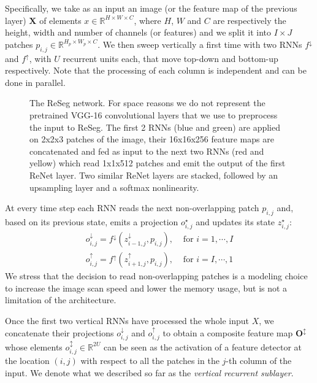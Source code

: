 \documentclass[times,art10,twocolumn,latex8]{article}
\newcommand{\RR}[0]{\mathbb{R}}
\begin{document}
Specifically, we take as an input an image (or the feature map of the previous
layer) $\mathbf{X}$ of elements $x \in \RR^{H \times W \times C}$, where $H$,
$W$ and $C$ are respectively the height, width and number of channels (or
features) and we split it into $I \times J$ patches $p_{i,j} \in \RR^{H_p
\times W_p \times C}$. We then sweep vertically a first time with two RNNs $f^{\downarrow}$ and $f^{\uparrow}$,
with $U$ recurrent units each, that move top-down and bottom-up respectively.
Note that the processing of each column is independent and can be done in
parallel.

\begin{figure*}[t]
    \advance{}\textwidth
    \centering
    \caption{The ReSeg network. For space reasons we do not represent the
        pretrained VGG-16 convolutional layers that we use to preprocess
        the input to ReSeg. The first 2 RNNs (blue and green) are applied on
        2x2x3 patches of the image, their 16x16x256 feature maps are
        concatenated and fed as input to the next two RNNs (red and yellow)
        which read 1x1x512 patches and emit the output of the first ReNet
        layer. Two similar ReNet layers are stacked, followed by an upsampling
        layer and a softmax nonlinearity.}
    \label{fig:ReSeg}
\end{figure*}

At every time step each RNN reads the next non-overlapping patch
$p_{i,j}$ and, based on its previous
state, emits a projection $o_{i,j}^{\star}$ and updates its state
$z_{i,j}^{\star}$:
\begin{align}
    o^{\downarrow}_{i,j} = f^{\downarrow}(z^{\downarrow}_{i-1,j},p_{i,j}),
        &\text{ for }i=1,\cdots, I\\
    o^{\uparrow}_{i,j} = f^{\uparrow}(z^{\uparrow}_{i+1,j},p_{i,j}),
        &\text{ for }i=I,\cdots,1
\end{align}
We stress that the decision to read non-overlapping patches is a modeling
choice to increase the image scan speed and lower the memory usage, but is not
a limitation of the architecture.

Once the first two vertical RNNs have processed the whole input $X$, we
concatenate their projections $o^{\downarrow}_{i,j}$ and $o^{\uparrow}_{i,j}$
to obtain a composite feature map $\mathbf{O^{\updownarrow}}$ whose elements
$o^{\updownarrow}_{i,j} \in \RR^{2U}$ can be seen as the activation of a
feature detector at the location $(i,j)$ with respect to all the patches in the
$j$-th column of the input. We denote what we described so far as the
\emph{vertical recurrent sublayer}.
\end{document}
